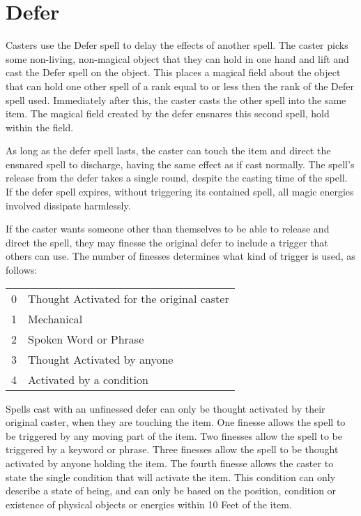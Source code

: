\section{Defer}


Casters use the Defer spell to delay the effects of another spell. The caster picks some non-living, non-magical object that they can hold in one hand and lift and cast the Defer spell on the object. This places a magical field about the object that can hold one other spell of a rank equal to or less then the rank of the Defer spell used. Immediately after this, the caster casts the other spell into the same item. The magical field created by the defer ensnares this second spell, hold within the field. 

As long as the defer spell lasts, the caster can touch the item and direct the ensnared spell to discharge, having the same effect as if cast normally. The spell’s release from the defer takes a single round, despite the casting time of the spell. If the defer spell expires, without triggering its contained spell, all magic energies involved dissipate harmlessly.

If the caster wants someone other than themselves to be able to release and direct the spell, they may finesse the original defer to include a trigger that others can use. The number of finesses determines what kind of trigger is used, as follows:

\begin{tabular}{@{} l l}
0 & Thought Activated for the original caster\\
1 & Mechanical\\
2 & Spoken Word or Phrase\\
3 & Thought Activated by anyone\\
4 & Activated by a condition
\end{tabular}

Spells cast with an unfinessed defer can only be thought activated by their original caster, when they are touching the item. One finesse allows the spell to be triggered by any moving part of the item. Two finesses allow the spell to be triggered by a keyword or phrase. Three finesses allow the spell to be thought activated by anyone holding the item. The fourth finesse allows the caster to state the single condition that will activate the item. This condition can only describe a state of being, and can only be based on the position, condition or existence of physical objects or energies within 10 Feet of the item.

